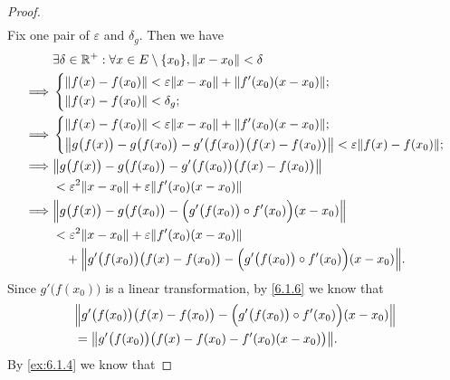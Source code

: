 \begin{proof}
\begin{align*}
  \end{align*}
  Fix one pair of \(\varepsilon\) and \(\delta_g\).
  Then we have
  \begin{align*}
             & \exists \delta \in \R^+ : \forall x \in E \setminus \set{x_0}, \norm*{x - x_0} < \delta                                      \\
    \implies & \begin{dcases}
                 \norm*{f(x) - f(x_0)} < \varepsilon \norm*{x - x_0} + \norm*{f'(x_0)(x - x_0)}; \\
                 \norm*{f(x) - f(x_0)} < \delta_g;
               \end{dcases}                                              \\
    \implies & \begin{dcases}
                 \norm*{f(x) - f(x_0)} < \varepsilon \norm*{x - x_0} + \norm*{f'(x_0)(x - x_0)}; \\
                 \norm*{g\big(f(x)\big) - g\big(f(x_0)\big) - g'\big(f(x_0)\big) \big(f(x) - f(x_0)\big)} < \varepsilon \norm*{f(x) - f(x_0)};
               \end{dcases} \\
    \implies & \norm*{g\big(f(x)\big) - g\big(f(x_0)\big) - g'\big(f(x_0)\big) \big(f(x) - f(x_0)\big)}                                     \\
             & < \varepsilon^2 \norm*{x - x_0} + \varepsilon \norm*{f'(x_0)(x - x_0)}                                                       \\
    \implies & \norm*{g\big(f(x)\big) - g\big(f(x_0)\big) - \Big(g'\big(f(x_0)\big) \circ f'(x_0)\Big) (x - x_0)}                           \\
             & < \varepsilon^2 \norm*{x - x_0} + \varepsilon \norm*{f'(x_0)(x - x_0)}                                                       \\
             & \quad + \norm*{g'\big(f(x_0)\big) \big(f(x) - f(x_0)\big) - \Big(g'\big(f(x_0)\big) \circ f'(x_0)\Big) (x - x_0)}.
  \end{align*}
  Since \(g'\big(f(x_0)\big)\) is a linear transformation, by \cref{6.1.6} we know that
  \begin{align*}
     & \norm*{g'\big(f(x_0)\big) \big(f(x) - f(x_0)\big) - \Big(g'\big(f(x_0)\big) \circ f'(x_0)\Big) (x - x_0)} \\
     & = \norm*{g'\big(f(x_0)\big) \big(f(x) - f(x_0) - f'(x_0) (x - x_0)\big)}.
  \end{align*}
  By \cref{ex:6.1.4} we know that

\end{proof}

